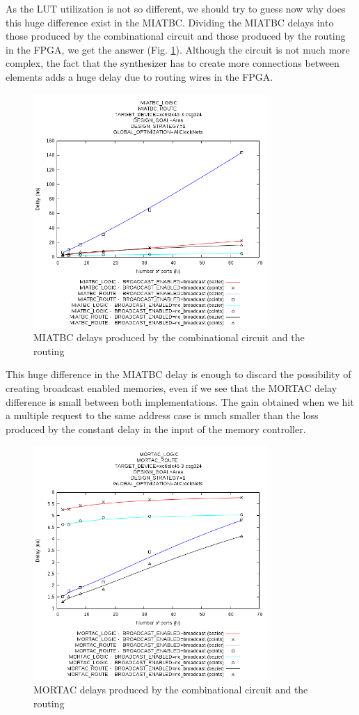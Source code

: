 \documentclass[conference,a4paper]{IEEEtran}
\begin{document}
As the LUT utilization is not so different, we should try to guess now why does this huge difference exist in the MIATBC. Dividing the MIATBC delays into those produced by the combinational circuit and those produced by the routing in the FPGA, we get the answer (Fig. \ref{miatbc_logic_vs_route}). Although the circuit is not much more complex, the fact that the synthesizer has to create more connections between elements adds a huge delay due to routing wires in the FPGA.

\begin{figure}[h]
\centering
\includegraphics[width=3.5in]{miatbc_logic_vs_route}
\caption{MIATBC delays produced by the combinational circuit and the routing}
\label{miatbc_logic_vs_route}
\end{figure}

This huge difference in the MIATBC delay is enough to discard the possibility of creating broadcast enabled memories, even if we see that the MORTAC delay difference is small between both implementations. The gain obtained when we hit a multiple request to the same address case is much smaller than the loss produced by the constant delay in the input of the memory controller.

\begin{figure}[h]
\centering
\includegraphics[width=3.5in]{mortac_logic_vs_route}
\caption{MORTAC delays produced by the combinational circuit and the routing}
\label{mortac_logic_vs_route}
\end{figure}
\end{document}

